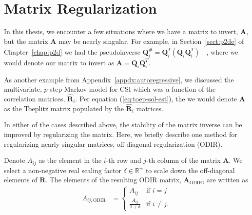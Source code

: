 \chapter{Matrix Regularization}
\label{appdx:odir}

In this thesis, we encounter a few situations where we have a matrix to invert, $\mathbf{A}$, but the matrix $\mathbf{A}$ may be nearly singular. For example, in Section~\ref{sect:p2de} of Chapter~\ref{chap:p2d} we had the pseudoinverse $\mathbf{Q}_i^{\#} = \mathbf{Q}_i^T\left(\mathbf{Q}_i\mathbf{Q}_i^T\right)^{-1}$, where we would denote our matrix to invert as $\mathbf{A}=\mathbf{Q}_i\mathbf{Q}_i^T$.

As another example from Appendix~\ref{appdx:autoregressive}, we discussed the multivariate, $p$-step Markov model for CSI which was a function of the correlation matrices, $\hat{\mathbf{R}}_i$. Per equation (\ref{eq:toep-sol-est}), the we would denote $\mathbf{A}$ as the Toeplitz matrix populated by the $\hat{\mathbf{R}}_i$ matrices.

In either of the cases described above, the stability of the matrix inverse can be improved by regularizing the matrix. Here, we briefly describe one method for regularizing nearly singular matrices, off-diagonal regularization (ODIR).

Denote $A_{ij}$ as the element in the $i$-th row and $j$-th column of the matrix $\mathbf{A}$. We select a non-negative real scaling factor $\delta \in \mathbb{R}^{+}$ to scale down the off-diagonal elements of $\mathbf{R}$. The elements of the resulting ODIR matrix, $\mathbf{A}_{\text{ODIR}}$, are written as
\begin{align}
    A_{ij, \text{ODIR}} &= 
        \begin{cases}
            A_{ij} & \text{if } i = j\\
            \frac{A_{ij}}{1+\delta} & \text{if } i \neq j.
        \end{cases}
\end{align}
